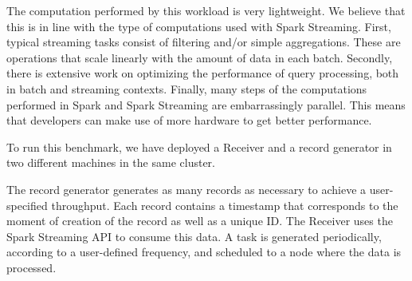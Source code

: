 The computation performed by this workload is very lightweight.
We believe that this is in line with the type of computations used with Spark Streaming.
First, typical streaming tasks consist of filtering and/or simple aggregations.
These are operations that scale linearly with the amount of data in each batch.
Secondly, there is extensive work on optimizing the performance of query processing, both in batch and streaming contexts.
Finally, many steps of the computations performed in Spark and Spark Streaming are embarrassingly parallel. 
This means that developers can make use of more hardware to get better performance. 


To run this benchmark, we have deployed a Receiver and a record generator in two different machines in the same cluster.

The record generator generates as many records as necessary to achieve a user-specified throughput.
Each record contains a timestamp that corresponds to the moment of creation of the record as well as a unique ID.
The Receiver uses the Spark Streaming API to consume this data. 
A task is generated periodically, according to a user-defined frequency, and scheduled to a node where the data is processed.

